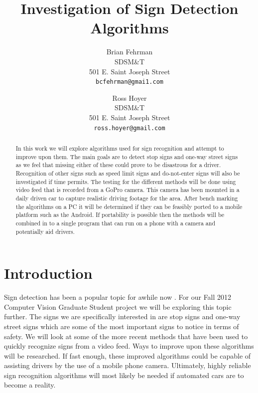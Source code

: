 \documentclass[10pt,twocolumn,letterpaper]{article}
\begin{document}
\title{ Investigation of Sign Detection Algorithms}

\author{Brian Fehrman\\
SDSM\&T\\
501 E. Saint Joseph Street\\
{\tt\small bcfehrman@gmai1.com}
\and
Ross Hoyer\\
SDSM\&T\\
501 E. Saint Joseph Street\\
{\tt\small ross.hoyer@gmail.com}
}

\maketitle
\thispagestyle{empty}

\begin{abstract}
In this work we will explore algorithms used for sign recognition and attempt to improve upon them. The main goals are to detect stop signs and one-way street signs as we feel that missing either of these could prove to be disastrous for a driver. Recognition of other signs such as speed limit signs and do-not-enter signs will also be investigated if time permits. The testing for the different methods will be done using video feed that is recorded from a GoPro camera. This camera has been mounted in a daily driven car to capture realistic driving footage for the area. After bench marking the algorithms on a PC it will be determined if they can be feasibly ported to a mobile platform such as the Android. If portability is possible then the methods will be combined in to a single program that can run on a phone with a camera and potentially aid drivers.

\end{abstract}



\section{Introduction}
Sign detection has been a popular topic for awhile now \cite{Piccioli1994, Mace1984}. For our Fall 2012 Computer Vision Graduate Student project we will be exploring this topic further. The signs we are specifically interested in are stop signs and one-way street signs which are some of the most important signs to notice in terms of safety. We will look at some of the more recent methods that have been used to quickly recognize signs from a video feed. Ways to improve upon these algorithms will be researched. If fast enough, these improved algorithms could be capable of assisting drivers by the use of a mobile phone camera. Ultimately, highly reliable sign recognition algorithms will most likely be needed if automated cars are to become a reality.
\end{document}
